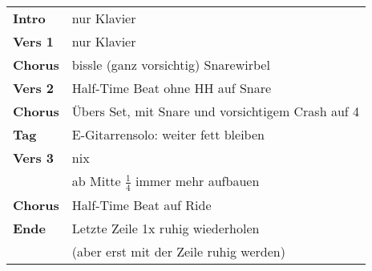 
\begin{tabular}{p{1.6cm}l}
	\textbf{Intro}  & nur Klavier                                       \\
	\textbf{Vers 1} & nur Klavier                                       \\
	\textbf{Chorus} & bissle (ganz vorsichtig) Snarewirbel              \\
	\textbf{Vers 2} & Half-Time Beat ohne HH auf Snare                  \\
	\textbf{Chorus} & Übers Set, mit Snare und vorsichtigem Crash auf 4 \\
	\textbf{Tag}    & E-Gitarrensolo: weiter fett bleiben               \\
	\textbf{Vers 3} & nix                                               \\
	                & ab Mitte $\frac{1}{4}$ immer mehr aufbauen        \\
	\textbf{Chorus} & Half-Time Beat auf Ride                           \\
	\textbf{Ende}   & Letzte Zeile 1x ruhig wiederholen                 \\
	                & (aber erst mit der Zeile ruhig werden)            \\
\end{tabular}
